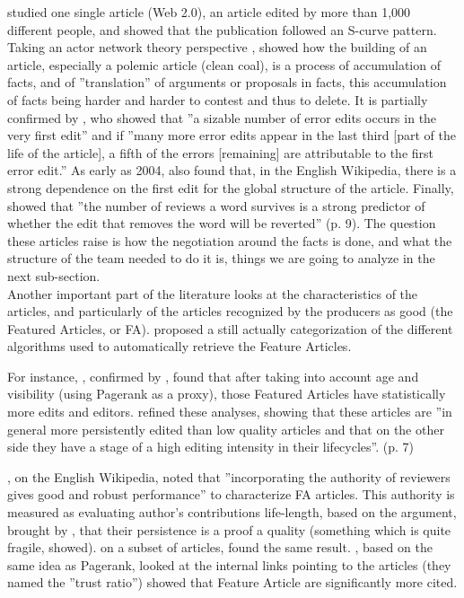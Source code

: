 \citet{GorgeonSwanson09} studied one single article (Web 2.0), an
article edited by more than 1,000 different people, and showed that
the publication followed an S-curve pattern. Taking an actor network
theory perspective \citep{Latour05,AkrichCallonLatour06}, \citet{Swarts09}
showed how the building of an article, especially a polemic article
(clean coal), is a process of accumulation of facts, and of ''translation''
of arguments or proposals in facts, this accumulation of facts being
harder and harder to contest and thus to delete. It is partially confirmed
by \citet{Luytetal08}, who showed that ''a sizable number of error
edits occurs in the very first edit'' and if ''many more error edits
appear in the last third {[}part of the life of the article{]}, a
fifth of the errors {[}remaining{]} are attributable to the first
error edit.'' As early as 2004, \citet{ViegasWattenbergDave04} also
found that, in the English Wikipedia, there is a strong dependence
on the first edit for the global structure of the article. Finally,
\citet{Halfakeretal09} showed that ''the number of reviews a word
survives is a strong predictor of whether the edit that removes the
word will be reverted'' (p. 9). The question these articles raise
is how the negotiation around the facts is done, and what the structure
of the team needed to do it is, things we are going to analyze in
the next sub-section. \\


Another important part of the literature looks at the characteristics
of the articles, and particularly of the articles recognized by the
producers as good (the Featured Articles, or FA). \citet{Luytetal08}
proposed a still actually categorization of the different algorithms
used to automatically retrieve the Feature Articles.

For instance, \citet{Lih04,Brandle05,WilkinsonHuberman07}, confirmed
by \citet{Ortega09}, found that after taking into account age and
visibility (using Pagerank as a proxy), those Featured Articles have
statistically more edits and editors. \citet{WohnerPeters09} refined
these analyses, showing that these articles are ''in general more
persistently edited than low quality articles and that on the other
side they have a stage of a high editing intensity in their lifecycles''.
(p. 7) 

\citet{Adleretal08b}, on the English Wikipedia, noted that ''incorporating
the authority of reviewers gives good and robust performance'' to
characterize FA articles. This authority is measured as evaluating
author's contributions life-length, based on the argument, brought
by \citet{Cross06}, that their persistence is a proof a quality (something
which is quite fragile, \citealp{Luytetal08} showed). \citet{Huetal07}
on a subset of articles, found the same result. \citet{Mcguinnessetal06},
based on the same idea as Pagerank, looked at the internal links pointing
to the articles (they named the ''trust ratio'') showed that Feature
Article are significantly more cited. 

